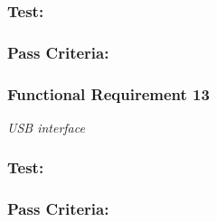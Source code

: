 \subsubsection*{Test:}
\subsubsection*{Pass Criteria:}

\subsubsection*{Functional Requirement 13}
\textit{USB interface}
\subsubsection*{Test:}
\subsubsection*{Pass Criteria:}

